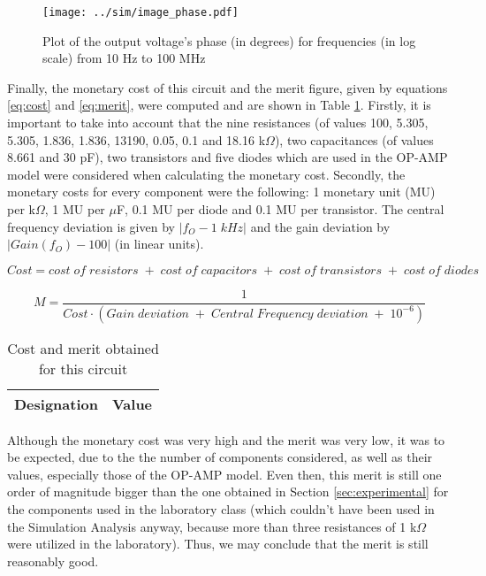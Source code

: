 \begin{figure}[H] \centering
  \texttt{[image: ../sim/image\_phase.pdf]}
  \caption{Plot of the output voltage's phase (in degrees) for frequencies (in log scale) from 10 Hz to 100 MHz}
  \label{fig:phase_simulation}
\end{figure}


Finally, the monetary cost of this circuit and the merit figure, given by equations \ref{eq:cost} and \ref{eq:merit}, were computed and are shown in Table \ref{tab:cost_merit}. Firstly, it is important to take into account that the nine resistances (of values 100, 5.305, 5.305, 1.836, 1.836, 13190, 0.05, 0.1 and 18.16 k$\Omega$), two capacitances (of values 8.661 and 30 pF), two transistors and five diodes which are used in the OP-AMP model were considered when calculating the monetary cost. Secondly, the monetary costs for every component were the following: 1 monetary unit (MU) per k$\Omega$, 1 MU per $\mu$F, 0.1 MU per diode and 0.1 MU per transistor. The central frequency deviation is given by $|f_O-1\;kHz|$ and the gain deviation by $|Gain(f_O)-100|$ (in linear units).

\begin{equation} \label{eq:cost}
  Cost = cost\;of\;resistors\;+\;cost\;of\;capacitors\;+\;cost\;of\;transistors\;+\;cost\;of\;diodes
\end{equation}

\begin{equation} \label{eq:merit}
  M=\frac{1}{Cost\cdot(Gain\;deviation\;+\;Central\;Frequency\;deviation\;+\;10^{-6})} 
\end{equation}


\begin{table}[H]
  \centering
  \begin{tabular}{|c|c|}
    \hline
        {\bf Designation} & {\bf Value} \\ \hline
        
  \end{tabular}
  \caption{Cost and merit obtained for this circuit} 
  \label{tab:cost_merit}
\end{table}

Although the monetary cost was very high and the merit was very low, it was to be expected, due to the the number of components considered, as well as their values, especially those of the OP-AMP model. Even then, this merit is still one order of magnitude bigger than the one obtained in Section \ref{sec:experimental} for the components used in the laboratory class (which couldn't have been used in the Simulation Analysis anyway, because more than three resistances of 1 k$\Omega$ were utilized in the laboratory). Thus, we may conclude that the merit is still reasonably good.
